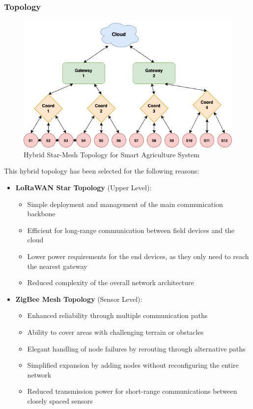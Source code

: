 \documentclass[12pt,a4paper]{article}
\begin{document}
\subsubsection{Topology}

\begin{figure}[H]
\centering
\includegraphics[width=\textwidth]{img/drawio/topology.png}
\caption{Hybrid Star-Mesh Topology for Smart Agriculture System}
\label{fig:topology}
\end{figure}

This hybrid topology has been selected for the following reasons:

\begin{itemize}
    \item \textbf{LoRaWAN Star Topology} (Upper Level):
    \begin{itemize}
        \item Simple deployment and management of the main communication backbone
        \item Efficient for long-range communication between field devices and the cloud
        \item Lower power requirements for the end devices, as they only need to reach the nearest gateway
        \item Reduced complexity of the overall network architecture
    \end{itemize}
    
    \item \textbf{ZigBee Mesh Topology} (Sensor Level):
    \begin{itemize}
        \item Enhanced reliability through multiple communication paths
        \item Ability to cover areas with challenging terrain or obstacles
        \item Elegant handling of node failures by rerouting through alternative paths
        \item Simplified expansion by adding nodes without reconfiguring the entire network
        \item Reduced transmission power for short-range communications between closely spaced sensors
    \end{itemize}
\end{itemize}
\end{document}

